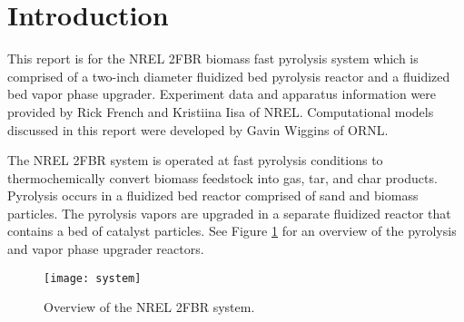 
\section{Introduction}

This report is for the NREL 2FBR biomass fast pyrolysis system which is comprised of a two-inch diameter fluidized bed pyrolysis reactor and a fluidized bed vapor phase upgrader. Experiment data and apparatus information were provided by Rick French and Kristiina Iisa of NREL. Computational models discussed in this report were developed by Gavin Wiggins of ORNL.

The NREL 2FBR system is operated at fast pyrolysis conditions to thermochemically convert biomass feedstock into gas, tar, and char products. Pyrolysis occurs in a fluidized bed reactor comprised of sand and biomass particles. The pyrolysis vapors are upgraded in a separate fluidized reactor that contains a bed of catalyst particles. See Figure \ref{fig:2fbr-system} for an overview of the pyrolysis and vapor phase upgrader reactors.

\begin{figure}[H]
    \centering
    \texttt{[image: system]}
    \caption{Overview of the NREL 2FBR system.}
    \label{fig:2fbr-system}
\end{figure}
